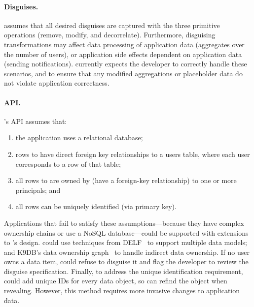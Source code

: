 \paragraph{Disguises.}
\sys assumes that all desired disguises are captured with the three primitive
operations (remove, modify, and decorrelate).
%
Furthermore, disguising transformations may affect data processing of
application data (\eg aggregates over the number of users), or application side
effects dependent on application data (\eg sending notifications).  \sys
currently expects the developer to correctly handle these scenarios, and to ensure
that any modified aggregations or placeholder data do not violate application
correctness.
%

\paragraph{API.}
\sys's API assumes that:
\begin{enumerate}[nosep]
    \item the application uses a relational database;
    \item rows to \xx have direct foreign key relationships to a users table,
    where each user corresponds to a row of that table;
\item all rows to \xx are owned by (have a foreign-key relationship) to one or more principals; and
    \item all rows can be uniquely identified (\eg via primary key).
\end{enumerate}
%
Applications that fail to satisfy these assumptions---\eg because they have
complex ownership chains or use a NoSQL database---could be supported with
extensions to \sys's design. \sys could use techniques from DELF~\cite{delf} to
support multiple data models; 
%
and K9DB's data ownership graph~\cite{k9db} to handle indirect data ownership.
If no user owns a data item, \sys could refuse to disguise it and flag the
developer to review the disguise specification.  
%
Finally, to address the unique identification requirement, \sys could add unique
IDs for every data object, so \sys can refind the object when revealing.
However, this method requires more invasive changes to application data. 
%

